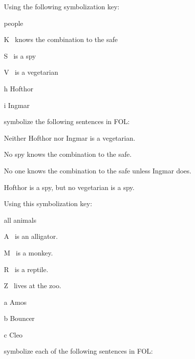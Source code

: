 \problempart
\label{pr.FOLvegetarians}
Using the following symbolization key:
\begin{ekey}
\item[\text{domain}] people
\item[K] \blank\ knows the combination to the safe
\item[S] \blank\ is a spy
\item[V] \blank\ is a vegetarian
\item[h] Hofthor
\item[i] Ingmar
\end{ekey}
symbolize the following sentences in FOL:
\begin{earg}
\item Neither Hofthor nor Ingmar is a vegetarian.
\item No spy knows the combination to the safe.
\item No one knows the combination to the safe unless Ingmar does.
\item Hofthor is a spy, but no vegetarian is a spy.
\end{earg}
\problempart\label{pr.FOLalligators}
Using this symbolization key:
\begin{ekey}
\item[\text{domain}] all animals
\item[A] \blank\ is an alligator.
\item[M] \blank\ is a monkey.
\item[R] \blank\ is a reptile.
\item[Z] \blank\ lives at the zoo.
\item[a] Amos
\item[b] Bouncer
\item[c] Cleo
\end{ekey}
symbolize each of the following sentences in FOL:
